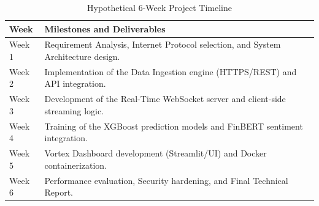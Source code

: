 \begin{table}[H]
\centering
\small
\begin{tabular}{|l|p{}|}
\hline
\textbf{Week} & \textbf{Milestones and Deliverables} \\ \hline
Week 1 & Requirement Analysis, Internet Protocol selection, and System Architecture design. \\ \hline
Week 2 & Implementation of the Data Ingestion engine (HTTPS/REST) and API integration. \\ \hline
Week 3 & Development of the Real-Time WebSocket server and client-side streaming logic. \\ \hline
Week 4 & Training of the XGBoost prediction models and FinBERT sentiment integration. \\ \hline
Week 5 & Vortex Dashboard development (Streamlit/UI) and Docker containerization. \\ \hline
Week 6 & Performance evaluation, Security hardening, and Final Technical Report. \\ \hline
\end{tabular}
\caption{Hypothetical 6-Week Project Timeline}
\label{tab:timeline}
\end{table}
